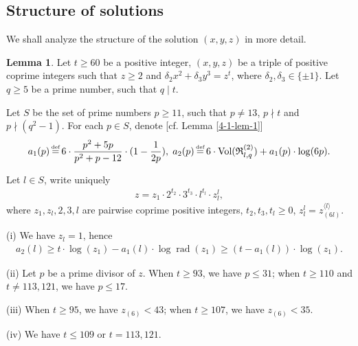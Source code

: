 \documentclass[a4paper, 12pt]{article}
\DeclareMathOperator{\defeq}{\overset{\text{\tiny{def}}}{=}}
\DeclareMathOperator{\rad}{\text{rad}}
\DeclareMathOperator{\Vol}{\text{Vol}}
\newcommand{\lagl}{\langle l \rangle}
\numberwithin{equation}{section}
\theoremstyle{definition}
\newtheorem{lem}[thm]{Lemma}
\begin{document}
\subsection{Structure of solutions}

We shall analyze the structure of the solution $(x,y,z)$ in more detail.

\begin{lem}  \label{3-2-lem-1}
Let $t\ge 60$ be a positive integer, $(x,y,z)$ be a triple of positive coprime integers such that $z\ge 2$ and $\delta_2 x^2 + \delta_3 y^3 = z^t$, where $\delta_2,\delta_3 \in \{\pm 1\}$. 
Let $q \ge 5$ be a prime number, such that $q\mid t$. 

Let $S$ be the set of prime numbers $p \ge 11$, such that $p\neq 13$, $p\nmid t$ and $p\nmid (q^2-1)$. For each $p\in S$, denote [cf. Lemma \ref{4-1-lem-1}]
\small\begin{align*}
a_1(p) \defeq 6 \cdot \frac{p^2+5p}{p^2+p-12}\cdot (1-\frac{1}{2p}),  \;
a_2(p) \defeq 6 \cdot \Vol(\mathfrak R_{l,q}^{(2)})  + a_1(p)\cdot \log(6p) .
\end{align*}\normalsize

Let $l\in S$, write uniquely \small\begin{gather}  \label{3-2-eq1}
z = z_1 \cdot 2^{t_2} \cdot 3^{t_3} \cdot l^{t_l} \cdot z_l^{l},
\end{gather}\normalsize
where $z_1, z_l, 2, 3, l$ are pairwise coprime positive integers, $t_2, t_3, t_l \ge 0$, $z_l^l = z_{(6l)}^{\lagl}$.

(i) We have $z_l = 1$, hence
\small\begin{align}  \label{3-2-eq2}
a_2(l) \ge t \cdot \log(z_1) - a_1(l) \cdot \log\rad(z_1) \ge  (t - a_1(l)) \cdot \log(z_1).
\end{align}\normalsize

(ii) Let $p$ be a prime divisor of $z$. 
When $t\ge 93$, we have $p \le 31$; when $t\ge 110$ and $t\neq 113, 121$, we have $p\le 17$.

(iii) When $t\ge 95$, we have $z_{(6)} < 43$; when $t \ge 107$, we have $z_{(6)} < 35$.

(iv) We have $t\le 109$ or $t = 113, 121$.
\end{lem}
\end{document}

